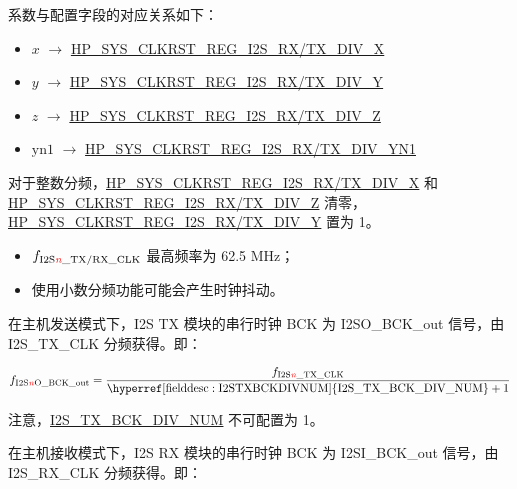 \documentclass[main\_\_CN.tex]{subfiles}
\begin{document}
系数与配置字段的对应关系如下：

\begin{itemize}
    \item $x$ $\rightarrow$ \hyperref[fielddesc:HPSYSCLKRSTREGI2S0RXDIVX]{HP\_SYS\_CLKRST\_REG\_I2S\_RX/TX\_DIV\_X}
    \item $y$ $\rightarrow$ \hyperref[fielddesc:HPSYSCLKRSTREGI2S0RXDIVY]{HP\_SYS\_CLKRST\_REG\_I2S\_RX/TX\_DIV\_Y}
    \item $z$ $\rightarrow$ \hyperref[fielddesc:HPSYSCLKRSTREGI2S0RXDIVZ]{HP\_SYS\_CLKRST\_REG\_I2S\_RX/TX\_DIV\_Z}
    \item $\mathrm{yn1}$ $\rightarrow$ \hyperref[fielddesc:HPSYSCLKRSTREGI2S0RXDIVYN1]{HP\_SYS\_CLKRST\_REG\_I2S\_RX/TX\_DIV\_YN1}
\end{itemize}

对于整数分频，\hyperref[fielddesc:HPSYSCLKRSTREGI2S0RXDIVX]{HP\_SYS\_CLKRST\_REG\_I2S\_RX/TX\_DIV\_X} 和 \hyperref[fielddesc:HPSYSCLKRSTREGI2S0RXDIVZ]{HP\_SYS\_CLKRST\_REG\_I2S\_RX/TX\_DIV\_Z} 清零，\hyperref[fielddesc:HPSYSCLKRSTREGI2S0RXDIVY]{HP\_SYS\_CLKRST\_REG\_I2S\_RX/TX\_DIV\_Y} 置为 1。

\begin{tiplisting}
\vspace{-2em}
\begin{itemize}
    \item $f_{\mathrm{I2S\regindex{n}\_TX/RX\_CLK}}$ 最高频率为 62.5 MHz；
    \item 使用小数分频功能可能会产生时钟抖动。    
\end{itemize}
\end{tiplisting}

在主机发送模式下，I2S TX 模块的串行时钟 BCK 为 I2SO\_BCK\_out 信号，由 I2S\_TX\_CLK 分频获得。即：

$$f_{\mathrm{I2S\regindex{n}O\_BCK\_out}} = \frac{f_{\mathrm{I2S\regindex{n}\_TX\_CLK}}}{\mathrm{\hyperref[fielddesc:I2STXBCKDIVNUM]{I2S\_TX\_BCK\_DIV\_NUM}} + 1}$$

\vspace{-1em}
\begin{tiplisting}
注意，\hyperref[fielddesc:I2STXBCKDIVNUM]{I2S\_TX\_BCK\_DIV\_NUM} 不可配置为 1。
\end{tiplisting}

在主机接收模式下，I2S RX 模块的串行时钟 BCK 为 I2SI\_BCK\_out 信号，由 I2S\_RX\_CLK 分频获得。即：
\end{document}
